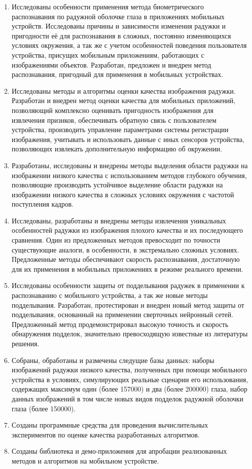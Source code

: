 \conclusion

\begin{enumerate}
	\item Исследованы особенности применения метода биометрического распознавания по радужной оболочке глаза в приложениях мобильных устройств. Исследованы причины и зависимости изменения радужки и пригодности её для распознавания в сложных, постоянно изменяющихся условиях окружения, а так же с учетом особенностей поведения пользователя устройства, присущих мобильным приложениям, работающих с изображениями объектов. Разработан, предложен и внедрен  метод распознавания, пригодный для применения в мобильных устройствах.
	\item Исследованы методы и алгоритмы оценки качества изображения радужки. Разработан и внедрен метод оценки качества для мобильных приложений, позволяющий комплексно оценивать пригодность изображения для извлечения признков, обеспечивать обратную связь с пользователем устройства, производить управление параметрами системы регистрации изображения, учитывать и использовать данные с иных сенсоров устройства, позволяющих извлекать дополнительную информацию об окружении.
	\item Разработаны, исследованы и внедрены методы выделения области радужки на изображении низкого качества с использованием методов глубокого обучения, позволяющие производить устойчивое выделение области радужки на изображении низкого качества в сложных условиях окружения с частотой поступления кадров.
	\item Исследованы, разработаны и внедрены методы извлечения уникальных особенностей радужки из изображения плохого качества и их последующего сравнения. Один из предложенных методов превосходит по точности существующие аналоги, в особенности, в экстремально сложных условиях. Предложенные методы обеспечивают скорость распознавания, достаточную для их применения в мобильных приложениях в режиме реального времени.
	\item Исследованы особенности защиты от подделывания радужек в применении к распознаванию с мобильного устройства, а так же новые методы подделывания. Разработан, протестирован и внедрен новый метод защиты от подделывания, основанный на применении сверточных нейронный сетей. Предложенный метод продемонстрировал высокую точность и скорость обнаружения подделок, значительно превосходящую известные из литературы решения.
	\item Собраны, обработаны и размечены следущие базы данных: наборы изображений радужки низкого качества, полученных при помощи мобильного устройства в условиях, симулирующих реальные сценарии его использования, содержащих максимум один (более 157000) и два (более 200000) глаза, набор данных изображений в том числе новых видов подделок радужной оболочки глаза (более 150000).
	\item Созданы программные средства для проведения вычислительных экспериментов по оценке качества разработанных алгоритмов.
	\item Созданы библиотека и демо-приложения для апробации реализованных методов и алгоритмов на мобильном устройстве.
\end{enumerate}
